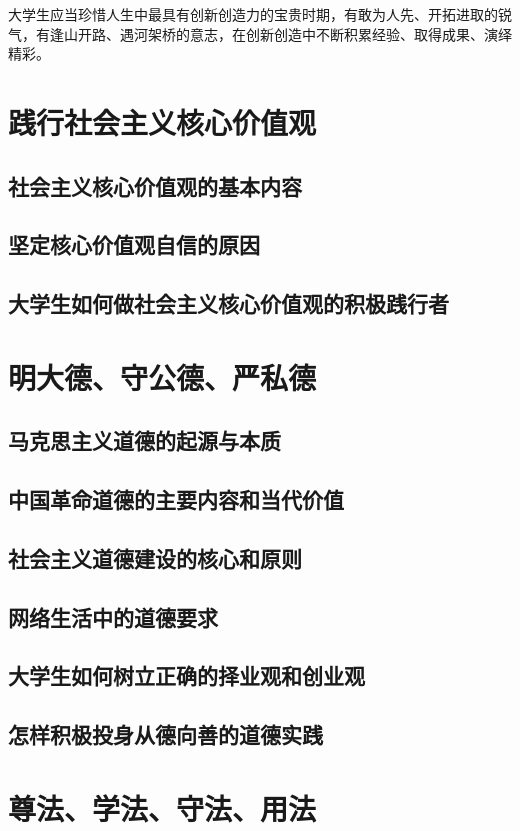 大学生应当珍惜人生中最具有创新创造力的宝贵时期，有敢为人先、开拓进取的锐气，有逢山开路、遇河架桥的意志，在创新创造中不断积累经验、取得成果、演绎精彩。

\section{践行社会主义核心价值观}
\subsection{社会主义核心价值观的基本内容}
\subsection{坚定核心价值观自信的原因}
\subsection{大学生如何做社会主义核心价值观的积极践行者}

\section{明大德、守公德、严私德}
\subsection{马克思主义道德的起源与本质}
\subsection{中国革命道德的主要内容和当代价值}
\subsection{社会主义道德建设的核心和原则}
\subsection{网络生活中的道德要求}
\subsection{大学生如何树立正确的择业观和创业观}
\subsection{怎样积极投身从德向善的道德实践}

\section{尊法、学法、守法、用法}
